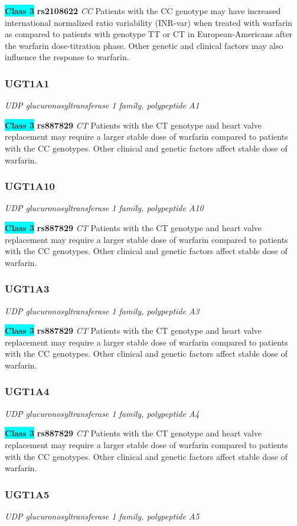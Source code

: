 \documentclass{report}
\begin{document}
\textbf{\colorbox{cyan} {Class 3}} \textbf{ rs2108622 } \textit{ CC }
Patients with the CC genotype may have increased international normalized ratio variability (INR-var) when treated with warfarin as compared to patients with genotype TT or CT in European-Americans after the warfarin dose-titration phase. Other genetic and clinical factors may also influence the response to warfarin.\newline\subsubsection{ UGT1A1 }
\textit{ UDP glucuronosyltransferase 1 family, polypeptide A1 }

\textbf{\colorbox{cyan} {Class 3}} \textbf{ rs887829 } \textit{ CT }
Patients with the CT genotype and heart valve replacement may require a larger stable dose of warfarin compared to patients with the CC genotypes. Other clinical and genetic factors affect stable dose of warfarin.\newline\subsubsection{ UGT1A10 }
\textit{ UDP glucuronosyltransferase 1 family, polypeptide A10 }

\textbf{\colorbox{cyan} {Class 3}} \textbf{ rs887829 } \textit{ CT }
Patients with the CT genotype and heart valve replacement may require a larger stable dose of warfarin compared to patients with the CC genotypes. Other clinical and genetic factors affect stable dose of warfarin.\newline\subsubsection{ UGT1A3 }
\textit{ UDP glucuronosyltransferase 1 family, polypeptide A3 }

\textbf{\colorbox{cyan} {Class 3}} \textbf{ rs887829 } \textit{ CT }
Patients with the CT genotype and heart valve replacement may require a larger stable dose of warfarin compared to patients with the CC genotypes. Other clinical and genetic factors affect stable dose of warfarin.\newline\subsubsection{ UGT1A4 }
\textit{ UDP glucuronosyltransferase 1 family, polypeptide A4 }

\textbf{\colorbox{cyan} {Class 3}} \textbf{ rs887829 } \textit{ CT }
Patients with the CT genotype and heart valve replacement may require a larger stable dose of warfarin compared to patients with the CC genotypes. Other clinical and genetic factors affect stable dose of warfarin.\newline\subsubsection{ UGT1A5 }
\textit{ UDP glucuronosyltransferase 1 family, polypeptide A5 }
\end{document}
